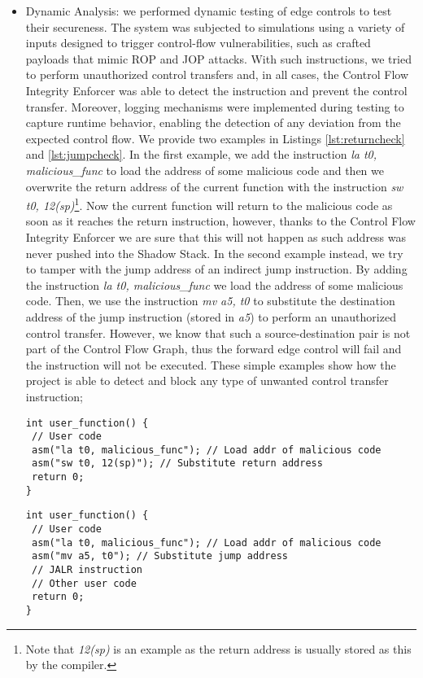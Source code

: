 \begin{itemize}
  \item Dynamic Analysis: we performed dynamic testing of edge controls to test
    their secureness. The system was subjected to simulations using a variety of
    inputs designed to trigger control-flow vulnerabilities, such as crafted
    payloads that mimic ROP and JOP attacks. With such instructions, we tried to
    perform unauthorized control transfers and, in all cases, the Control Flow
    Integrity Enforcer was able to detect the instruction and prevent the
    control transfer. Moreover, logging mechanisms were implemented during
    testing to capture runtime behavior, enabling the detection of any deviation
    from the expected control flow. We provide two examples in Listings
    \ref{lst:returncheck} and \ref{lst:jumpcheck}. In the first example, we add
    the instruction \textit{la t0, malicious\_func} to load the address of some malicious
    code and then we overwrite the return address of the current function with the
    instruction \textit{sw t0, 12(sp)}\footnote{Note that \textit{12(sp)} is an example
    as the return address is usually stored as this by the compiler.}. Now the
    current function will return to the malicious code as soon as it reaches the
    return instruction, however, thanks to the Control Flow Integrity Enforcer
    we are sure that this will not happen as such address was never pushed into
    the Shadow Stack. In the second example instead, we try to tamper with the
    jump address of an indirect jump instruction. By adding the instruction \textit{la
    t0, malicious\_func} we load the address of some malicious code. Then, we
    use the instruction \textit{mv a5, t0} to substitute the destination address
    of the jump instruction (stored in \textit{a5}) to perform an unauthorized
    control transfer. However, we know that such a source-destination pair is
    not part of the Control Flow Graph, thus the forward edge control will fail and
    the instruction will not be executed. These simple examples show how the
    project is able to detect and block any type of unwanted control transfer
    instruction;

    \begin{lstlisting}[style=CStyle, caption = Return address tampering snippet, label={lst:returncheck}]
int user_function() {
 // User code
 asm("la t0, malicious_func"); // Load addr of malicious code
 asm("sw t0, 12(sp)"); // Substitute return address
 return 0;
}
 \end{lstlisting}

    \begin{lstlisting}[style=CStyle, caption = Jump address tampering snippet, label={lst:jumpcheck}]
int user_function() {
 // User code
 asm("la t0, malicious_func"); // Load addr of malicious code
 asm("mv a5, t0"); // Substitute jump address
 // JALR instruction
 // Other user code
 return 0;
}
 \end{lstlisting}


\end{itemize}
